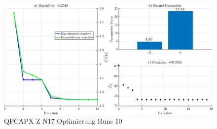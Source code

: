 \clearpage
\begin{landscape}
\begin{figure}[tbph]
	\centering
	\includegraphics[width=\linewidth]{chapters/images/4-EuOExp/QFCAPX-Z-N17-Opt}
	\caption[QFCAPX Z N17 Optimierung Runs 10]{QFCAPX Z N17 Optimierung Runs 10}
	\label{fig:qfcapx-z-n17-opt}
\end{figure}
\end{landscape}


\clearpage

